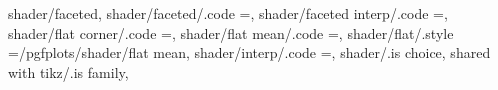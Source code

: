 shader/faceted,
shader/faceted/.code                                               ={\def\pgfplotsplothandlermesh@shader{1}},                                                                                          
shader/faceted interp/.code                                        ={\def\pgfplotsplothandlermesh@shader{3}},                                                                                          
shader/flat corner/.code                                           ={\def\pgfplotsplothandlermesh@shader{0}\def\pgfplotsplothandlermesh@flatmode{c}},                                                  
shader/flat mean/.code                                             ={\def\pgfplotsplothandlermesh@shader{0}\def\pgfplotsplothandlermesh@flatmode{m}},                                                  
shader/flat/.style                                                 ={/pgfplots/shader/flat mean},                                                                                                     
shader/interp/.code                                                ={\def\pgfplotsplothandlermesh@shader{2}},                                                                                          
shader/.is choice,
shared with tikz/.is family,

